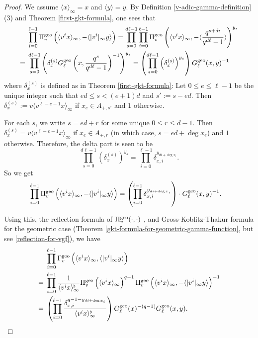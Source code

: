 \documentclass[11pt]{amsart}
\theoremstyle{plain}
\theoremstyle{definition}
\theoremstyle{remark}
\numberwithin{equation}{section}
\newcommand{\ang}[1]{\langle #1 \rangle}
\newcommand{\anginf}[1]{\langle #1 \rangle_\infty}
\newcommand{\vgf}{\Pi_v^{\textnormal{geo}}}
\newcommand{\vgg}{\Gamma_v^{\textnormal{geo}}}
\newcommand{\ggs}{G_\l^{\textnormal{geo}}}
\let\l\ell
\begin{document}
	\begin{proof}
		We assume $\anginf{x} = x$ and $\ang{y} = y$.
		By Definition \ref{v-adic-gamma-definition}(3) and Theorem \ref{first-gkt-formula}, one sees that
		\begin{align*}
			&\prod_{i=0}^{\l-1} \vgf \left( \anginf{v^ix}, -\ang{|v^i|_\infty y} \right)
			= \prod_{s=0}^{d\l-1} \prod_{i=0}^{\l-1} \vgf \left( \anginf{v^ix}, -\ang{\frac{q^{s+di}}{q^{d\l}-1}} \right)^{y_s}      \\
			={} &\prod_{s=0}^{d\l-1} \left( \delta_x^{(s)} \ggs\left(x,\frac{q^s}{q^{d\l}-1}\right)^{-1} \right)^{y_s}
			= \left( \prod_{s=0}^{d\l-1} \left( \delta_x^{(s)} \right)^{y_s} \right) \ggs (x,y)^{-1}
		\end{align*}
		where $\delta_x^{(s)}$ is defined as in Theorem \ref{first-gkt-formula}:
		Let $0 \leq e \leq \l-1$ be the unique integer such that $ed \leq s < (e+1)d$ and $s' := s - ed$.
		Then $\delta_x^{(s)} := v \anginf{v^{\l-e-1}x}$ if $x_e \in A_{+,s'}$ and $1$ otherwise.
		
		For each $s$, we write $s = ed + r$ for some unique $0 \leq r \leq d-1$.
		Then $\delta_x^{(s)} = v \anginf{v^{\l-e-1}x}$ if $x_e \in A_{+,r}$ (in which case, $s = ed + \deg x_e$) and $1$ otherwise.
		Therefore, the delta part is seen to be
		$$
		\prod_{s=0}^{d\l-1} \left( \delta_x^{(s)} \right)^{y_s}
		= \prod_{i=0}^{\l-1} \delta_{x,i}^{y_{di+\deg x_i}}.
		$$
		So we get
		\begin{align*}
			\prod_{i=0}^{\l-1} \vgf \left( \anginf{v^ix}, -\ang{|v^i|_\infty y} \right)
			&= \left( \prod_{i=0}^{\l-1} \delta_{x,i}^{y_{di+\deg x_i}} \right)
			\cdot
			\ggs (x,y)^{-1}.
		\end{align*}
		
		Using this, the reflection formula of $\vgf(\cdot,\cdot)$ \cite[Lemma 2.3]{thakur1991gamma}, and Gross-Koblitz-Thakur formula for the geometric case (Theorem \ref{gkt-formula-for-geometric-gamma-function}, but see \eqref{reflection-for-vgf}), we have
		\begin{align*}
			&\prod_{i=0}^{\l-1} \vgg \left( \anginf{v^ix}, \ang{|v^i|_\infty y} \right)   \\
			={} &\prod_{i=0}^{\l-1} \frac{1}{\anginf{v^ix}^\flat} \vgf\left(\anginf{v^ix}\right)^{q-1}
			\vgf \left( \anginf{v^ix}, -\ang{|v^i|_\infty y} \right)^{-1}       \\
			={} &\left( \prod_{i=0}^{\l-1} \frac{\delta_{x,i}^{q-1-y_{di+\deg x_i}}}{\anginf{v^ix}^\flat} \right)
			\ggs (x)^{-(q-1)} \ggs(x,y).
		\end{align*}
	\end{proof}
	
\end{document}
